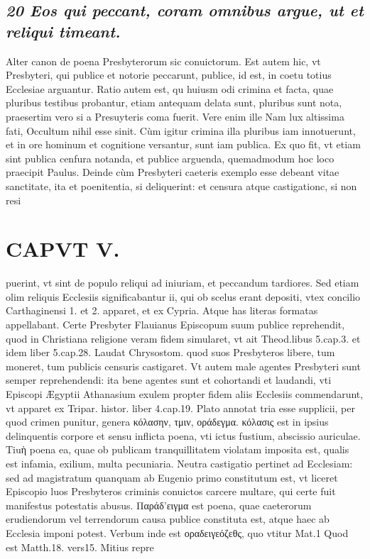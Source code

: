 \documentclass{article}
\begin{document}
\begin{pages}
\subsection*{\textit{20 Eos qui peccant, coram omnibus argue, ut et reliqui timeant. }}\pstart Alter canon de poena Presbyterorum sic conuictorum. Est autem hic, vt Presbyteri, qui publice et notorie peccarunt, publice, id est, in coetu totius Ecclesiae arguantur.  \pend\pstart Ratio autem est, qu huiusm odi crimina et facta, quae pluribus testibus probantur, etiam antequam delata sunt, pluribus sunt nota, praesertim vero si a Presuyteris coma fuerit. Vere enim ille Nam lux altissima fati, Occultum nihil esse sinit. Cùm igitur crimina illa pluribus iam innotuerunt, et in ore hominum et cognitione versantur, sunt iam publica. Ex quo fit, vt etiam sint publica cenfura notanda, et publice arguenda, quemadmodum hoc loco praecipit Paulus.  \pend\pstart Deinde cùm Presbyteri caeteris exemplo esse debeant vitae sanctitate, ita et poenitentia, si deliquerint: et censura atque castigationc, si non resi\pend
\section*{CAPVT  V. }
\marginpar{[ p.317 ]}\pstart puerint, vt sint de populo reliqui ad iniuriam, et peccandum tardiores. Sed etiam olim reliquis Ecclesiis significabantur ii, qui ob scelus erant depositi, vtex concilio Carthaginensi 1. et 2. apparet, et ex Cypria. Atque has literas formatas appellabant. Certe Presbyter Flauianus Episcopum suum publice reprehendit, quod in Christiana religione veram fidem simularet, vt ait Theod.libus 5.cap.3. et idem liber  5.cap.28. Laudat Chrysostom. quod suos Presbyteros libere, tum moneret, tum publicis censuris castigaret. Vt autem male agentes Presbyteri sunt semper reprehendendi: ita bene agentes sunt et cohortandi et laudandi, vti Episcopi Ægyptii Athanasium exulem propter fidem aliis Ecclesiis commendarunt, vt apparet ex Tripar. histor. liber  4.cap.19.  \pend\pstart Plato annotat tria esse supplicii, per quod crimen punitur, genera κόλασην, τμιν, οράδεγμα. κόλασις est in ipsius delinquentis corpore et sensu inflicta poena, vti ictus fustium, abscissio auriculae. Tiuὴ poena ea, quae ob publicam tranquillitatem violatam imposita est, qualis est infamia, exilium, multa pecuniaria. Neutra castigatio pertinet ad Ecclesiam: sed ad magistratum quanquam ab Eugenio primo constitutum est, vt liceret Episcopio luos Presbyteros criminis conuictos carcere multare, qui certe fuit manifestus potestatis abusus. Παράδ'ειγμα est poena, quae caeterorum erudiendorum vel terrendorum causa publice constituta est, atque haec ab Ecclesia imponi potest. Verbum inde est οραδειγεόζεθς, quo vtitur Mat.1  \pend{} Quod est Matth.18. vers15. Mitius repre\pend

\end{pages}
\end{document}
